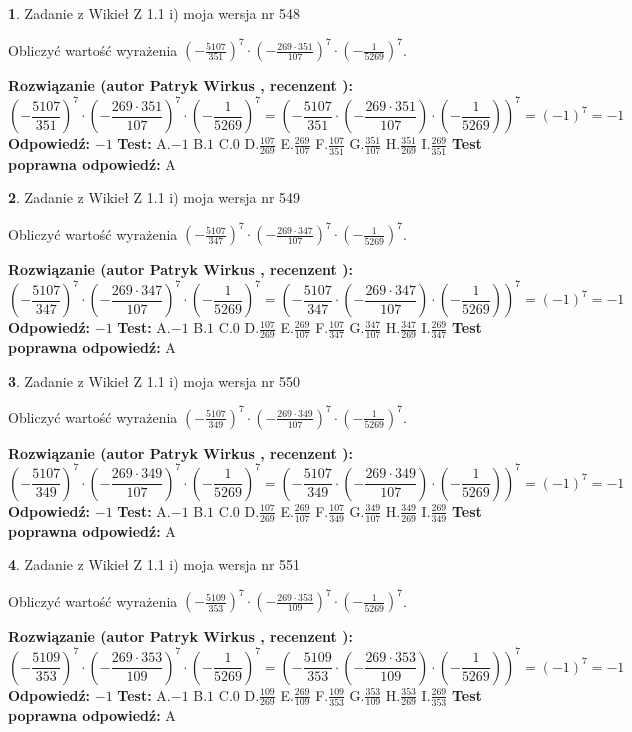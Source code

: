 \documentclass[12pt, a4paper]{article}
\theoremstyle{definition} %
\newtheorem{zad}{}
\newcommand{\zadStart}[1]{\begin{zad}#1\newline}
\newcommand{\zadStop}{\end{zad}}
\newcommand{\rozwStart}[2]{\noindent \textbf{Rozwiązanie (autor #1 , recenzent #2): }\newline}
\newcommand{\rozwStop}{\newline}
\newcommand{\odpStart}{\noindent \textbf{Odpowiedź:}\newline}
\newcommand{\odpStop}{\newline}
\newcommand{\testStart}{\noindent \textbf{Test:}\newline}
\newcommand{\testStop}{\newline}
\newcommand{\kluczStart}{\noindent \textbf{Test poprawna odpowiedź:}\newline}
\newcommand{\kluczStop}{\newline}
\begin{document}
\zadStart{Zadanie z Wikieł Z 1.1 i) moja wersja nr 548}

Obliczyć wartość wyrażenia $(-\frac{5107}{351})^{7} \cdot (-\frac{269 \cdot 351}{107})^{7} \cdot (-\frac{1}{5269})^{7}$.
\zadStop
\rozwStart{Patryk Wirkus}{}
$$(-\frac{5107}{351})^{7} \cdot (-\frac{269 \cdot 351}{107})^{7} \cdot (-\frac{1}{5269})^{7} = (-\frac{5107}{351} \cdot (-\frac{269 \cdot 351}{107}) \cdot (-\frac{1}{5269}))^{7} = (-1)^{7} = -1$$
\rozwStop
\odpStart
$-1$
\odpStop
\testStart
A.$-1$ B.$1$ C.$0$ D.$\frac{107}{269}$ E.$\frac{269}{107}$
F.$\frac{107}{351}$ G.$\frac{351}{107}$
H.$\frac{351}{269}$
I.$\frac{269}{351}$
\testStop
\kluczStart
A
\kluczStop



\zadStart{Zadanie z Wikieł Z 1.1 i) moja wersja nr 549}

Obliczyć wartość wyrażenia $(-\frac{5107}{347})^{7} \cdot (-\frac{269 \cdot 347}{107})^{7} \cdot (-\frac{1}{5269})^{7}$.
\zadStop
\rozwStart{Patryk Wirkus}{}
$$(-\frac{5107}{347})^{7} \cdot (-\frac{269 \cdot 347}{107})^{7} \cdot (-\frac{1}{5269})^{7} = (-\frac{5107}{347} \cdot (-\frac{269 \cdot 347}{107}) \cdot (-\frac{1}{5269}))^{7} = (-1)^{7} = -1$$
\rozwStop
\odpStart
$-1$
\odpStop
\testStart
A.$-1$ B.$1$ C.$0$ D.$\frac{107}{269}$ E.$\frac{269}{107}$
F.$\frac{107}{347}$ G.$\frac{347}{107}$
H.$\frac{347}{269}$
I.$\frac{269}{347}$
\testStop
\kluczStart
A
\kluczStop



\zadStart{Zadanie z Wikieł Z 1.1 i) moja wersja nr 550}

Obliczyć wartość wyrażenia $(-\frac{5107}{349})^{7} \cdot (-\frac{269 \cdot 349}{107})^{7} \cdot (-\frac{1}{5269})^{7}$.
\zadStop
\rozwStart{Patryk Wirkus}{}
$$(-\frac{5107}{349})^{7} \cdot (-\frac{269 \cdot 349}{107})^{7} \cdot (-\frac{1}{5269})^{7} = (-\frac{5107}{349} \cdot (-\frac{269 \cdot 349}{107}) \cdot (-\frac{1}{5269}))^{7} = (-1)^{7} = -1$$
\rozwStop
\odpStart
$-1$
\odpStop
\testStart
A.$-1$ B.$1$ C.$0$ D.$\frac{107}{269}$ E.$\frac{269}{107}$
F.$\frac{107}{349}$ G.$\frac{349}{107}$
H.$\frac{349}{269}$
I.$\frac{269}{349}$
\testStop
\kluczStart
A
\kluczStop



\zadStart{Zadanie z Wikieł Z 1.1 i) moja wersja nr 551}

Obliczyć wartość wyrażenia $(-\frac{5109}{353})^{7} \cdot (-\frac{269 \cdot 353}{109})^{7} \cdot (-\frac{1}{5269})^{7}$.
\zadStop
\rozwStart{Patryk Wirkus}{}
$$(-\frac{5109}{353})^{7} \cdot (-\frac{269 \cdot 353}{109})^{7} \cdot (-\frac{1}{5269})^{7} = (-\frac{5109}{353} \cdot (-\frac{269 \cdot 353}{109}) \cdot (-\frac{1}{5269}))^{7} = (-1)^{7} = -1$$
\rozwStop
\odpStart
$-1$
\odpStop
\testStart
A.$-1$ B.$1$ C.$0$ D.$\frac{109}{269}$ E.$\frac{269}{109}$
F.$\frac{109}{353}$ G.$\frac{353}{109}$
H.$\frac{353}{269}$
I.$\frac{269}{353}$
\testStop
\kluczStart
A
\kluczStop
\end{document}

